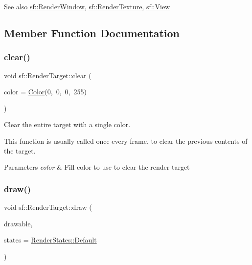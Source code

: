 \begin{DoxySeeAlso}{See also}
\hyperlink{classsf_1_1_render_window}{sf\+::\+Render\+Window}, \hyperlink{classsf_1_1_render_texture}{sf\+::\+Render\+Texture}, \hyperlink{classsf_1_1_view}{sf\+::\+View} 
\end{DoxySeeAlso}


\subsection{Member Function Documentation}
\mbox{\label{classsf_1_1_render_target_a6bb6f0ba348f2b1e2f46114aeaf60f26}} 
\subsubsection{\texorpdfstring{clear()}{clear()}}
{\footnotesize\ttfamily void sf\+::\+Render\+Target\+::clear (\begin{DoxyParamCaption}\item[{const \hyperlink{classsf_1_1_color}{Color} \&}]{color = {\ttfamily \hyperlink{classsf_1_1_color}{Color}(0,~0,~0,~255)} }\end{DoxyParamCaption})}



Clear the entire target with a single color. 

This function is usually called once every frame, to clear the previous contents of the target.


\begin{DoxyParams}{Parameters}
{\em color} & Fill color to use to clear the render target \\
\hline
\end{DoxyParams}
\mbox{\label{classsf_1_1_render_target_a12417a3bcc245c41d957b29583556f39}} 
\subsubsection{\texorpdfstring{draw()}{draw()}\hspace{0.1cm}{\footnotesize\ttfamily [1/2]}}
{\footnotesize\ttfamily void sf\+::\+Render\+Target\+::draw (\begin{DoxyParamCaption}\item[{const \hyperlink{classsf_1_1_drawable}{Drawable} \&}]{drawable,  }\item[{const \hyperlink{classsf_1_1_render_states}{Render\+States} \&}]{states = {\ttfamily \hyperlink{classsf_1_1_render_states_ad29672df29f19ce50c3021d95f2bb062}{Render\+States\+::\+Default}} }\end{DoxyParamCaption})}



